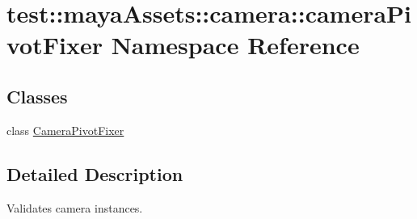 \hypertarget{namespacetest_1_1mayaAssets_1_1camera_1_1cameraPivotFixer}{\section{test\-:\-:maya\-Assets\-:\-:camera\-:\-:camera\-Pivot\-Fixer \-Namespace \-Reference}
\label{d7/d15/namespacetest_1_1mayaAssets_1_1camera_1_1cameraPivotFixer}
}
\subsection*{\-Classes}
\begin{DoxyCompactItemize}
\item 
class \hyperlink{classtest_1_1mayaAssets_1_1camera_1_1cameraPivotFixer_1_1CameraPivotFixer}{\-Camera\-Pivot\-Fixer}
\end{DoxyCompactItemize}


\subsection{\-Detailed \-Description}
\begin{DoxyVerb}
Validates camera instances.
\end{DoxyVerb}
 